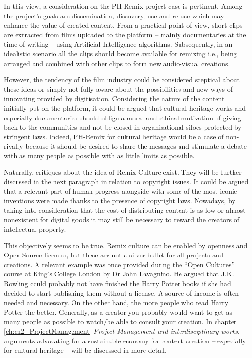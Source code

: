 In this view, a consideration on the PH-Remix project case is pertinent. Among the project’s goals are dissemination, discovery, use and re-use which may enhance the value of created content. From a practical point of view, short clips are extracted from films uploaded to the platform – mainly documentaries at the time of writing – using Artificial Intelligence algorithms. Subsequently, in an idealistic scenario all the clips should become available for remixing i.e., being arranged and combined with other clips to form new audio-visual creations.

However, the tendency of the film industry could be considered sceptical about these ideas or simply not fully aware about the possibilities and new ways of innovating provided by digitisation. Considering the nature of the content initially put on the platform, it could be argued that cultural heritage works and especially documentaries should oblige a moral and ethical motivation of giving back to the communities and not be closed in organisational siloes protected by stringent laws. Indeed, PH-Remix for cultural heritage would be a case of non-rivalry because it should be desired to share the messages and stimulate a debate with as many people as possible with as little limits as possible.

Naturally, critiques about the idea of Remix Culture exist. They will be further discussed in the next paragraph in relation to copyright issues. It could be argued that a relevant part of human progress alongside with some of the most iconic inventions were made thanks to the presence of copyright laws. Nowadays, by taking into consideration that the cost of distributing content is as low or almost nonexistent for digital goods it may still be necessary to reward the creators of intellectual property.

This objectively seems to be true. Remix culture can be enabled by openness and Open Source licenses, but these are not a silver bullet for all projects and creations. A relevant example was once provided during the “Open Cultures” course at King’s College London by Dr John Lavagnino. He argued that J.K. Rowling could probably not have finished the Harry Potter books if she had decided to start publishing them without a license. A source of income is often needed and necessary. On the other hand, the more people who read Harry Potter the better. Generally, as a creator you probably would want to get as many people as possible to watch/be able to consult your creation. In chapter \ref{ch:ch2_ProjectManagement} \emph{Project Management and interdisciplinary works}, arguments advocating for a sustainable economy for content creation – especially for cultural heritage – will be discussed in more detail. 

